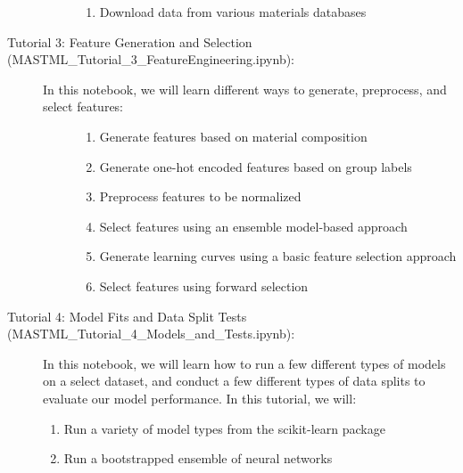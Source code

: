 \documentclass[letterpaper,10pt,english]{sphinxmanual}
\begin{document}
\begin{description}
\begin{description}
\begin{enumerate}
\item {} 
Download data from various materials databases

\end{enumerate}

\end{description}

\item[{Tutorial 3: Feature Generation and Selection (MASTML\_Tutorial\_3\_FeatureEngineering.ipynb):}] \leavevmode\begin{description}
\item[{In this notebook, we will learn different ways to generate, preprocess, and select features:}] \leavevmode\begin{enumerate}
%
\item {} 
Generate features based on material composition

\item {} 
Generate one-hot encoded features based on group labels

\item {} 
Preprocess features to be normalized

\item {} 
Select features using an ensemble model-based approach

\item {} 
Generate learning curves using a basic feature selection approach

\item {} 
Select features using forward selection

\end{enumerate}

\end{description}

\item[{Tutorial 4: Model Fits and Data Split Tests (MASTML\_Tutorial\_4\_Models\_and\_Tests.ipynb):}] \leavevmode
In this notebook, we will learn how to run a few different types of models on a select dataset, and conduct
a few different types of data splits to evaluate our model performance. In this tutorial, we will:
\begin{enumerate}
%
\item {} 
Run a variety of model types from the scikit-learn package

\item {} 
Run a bootstrapped ensemble of neural networks


\end{enumerate}
\end{description}
\end{document}
